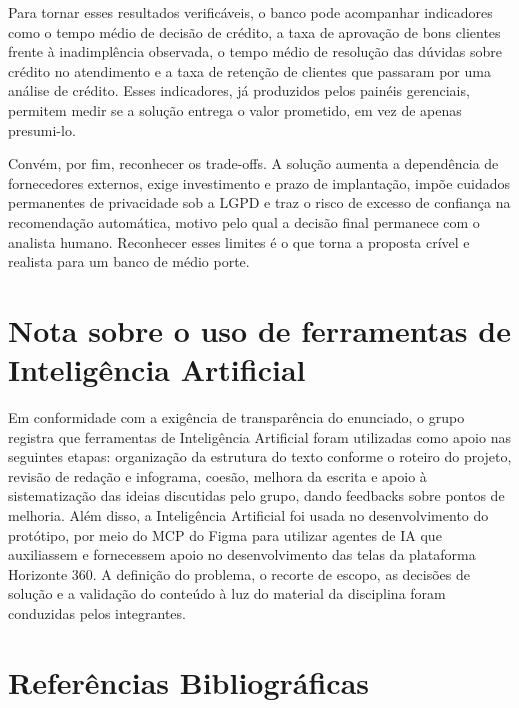 \documentclass[12pt,a4paper]{article}
\begin{document}
Para tornar esses resultados verific\'aveis, o banco pode acompanhar indicadores como o tempo m\'edio de decis\~ao de cr\'edito, a taxa de aprova\c{c}\~ao de bons clientes frente \`a inadimpl\^encia observada, o tempo m\'edio de resolu\c{c}\~ao das d\'uvidas sobre cr\'edito no atendimento e a taxa de reten\c{c}\~ao de clientes que passaram por uma an\'alise de cr\'edito. Esses indicadores, j\'a produzidos pelos pain\'eis gerenciais, permitem medir se a solu\c{c}\~ao entrega o valor prometido, em vez de apenas presumi-lo.

Conv\'em, por fim, reconhecer os trade-offs. A solu\c{c}\~ao aumenta a depend\^encia de fornecedores externos, exige investimento e prazo de implanta\c{c}\~ao, imp\~oe cuidados permanentes de privacidade sob a LGPD e traz o risco de excesso de confian\c{c}a na recomenda\c{c}\~ao autom\'atica, motivo pelo qual a decis\~ao final permanece com o analista humano. Reconhecer esses limites \'e o que torna a proposta cr\'ivel e realista para um banco de m\'edio porte.

\section{Nota sobre o uso de ferramentas de Intelig\^encia Artificial}

Em conformidade com a exig\^encia de transpar\^encia do enunciado, o grupo registra que ferramentas de Intelig\^encia Artificial foram utilizadas como apoio nas seguintes etapas: organiza\c{c}\~ao da estrutura do texto conforme o roteiro do projeto, revis\~ao de reda\c{c}\~ao e infograma, coes\~ao, melhora da escrita e apoio \`a sistematiza\c{c}\~ao das ideias discutidas pelo grupo, dando feedbacks sobre pontos de melhoria. Al\'em disso, a Intelig\^encia Artificial foi usada no desenvolvimento do prot\'otipo, por meio do MCP do Figma para utilizar agentes de IA que auxiliassem e fornecessem apoio no desenvolvimento das telas da plataforma Horizonte 360. A defini\c{c}\~ao do problema, o recorte de escopo, as decis\~oes de solu\c{c}\~ao e a valida\c{c}\~ao do conte\'udo \`a luz do material da disciplina foram conduzidas pelos integrantes.

\clearpage
\section{Refer\^encias Bibliogr\'aficas}
\setlength{\parindent}{0pt}
\begingroup
\setlength{\parskip}{0.8em}
\newcommand{\refitem}[1]{\noindent\hangindent=1cm #1\par}
\end{document}
